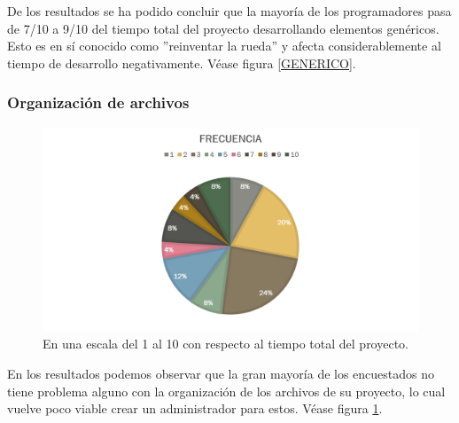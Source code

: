 \documentclass[]{article}
\begin{document}
De los resultados se ha podido concluir que la mayor\'ia de los programadores pasa de 7/10 a 9/10 del tiempo total del proyecto desarrollando elementos gen\'ericos. Esto es en s\'i conocido como ''reinventar la rueda'' y afecta considerablemente al tiempo de desarrollo negativamente. V\'ease figura \ref{GENERICO}.


\subsubsection{Organizaci\'on de archivos}
\begin{figure}[H]
	
	\centering
	\includegraphics[width=1\textwidth]{Encuesta_tiempo_archivos}
	\caption{En una escala del 1 al 10 con respecto al tiempo total del proyecto.} 
	\label{ARCHIVOS}
	
\end{figure}
En los resultados podemos observar que la gran mayor\'ia de los encuestados no tiene problema alguno con la organizaci\'on de los archivos de su proyecto, lo cual vuelve poco viable crear un administrador para estos. V\'ease figura \ref{ARCHIVOS}.
\end{document}
